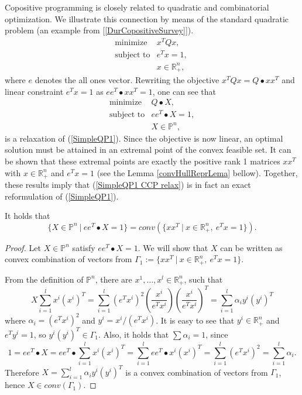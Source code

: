 \documentclass[12pt]{book}
\theoremstyle{definition}
\begin{document}
Copositive programming is closely related to quadratic and combinatorial
optimization. 
We illustrate this connection by means of the standard quadratic
problem (an example from [\ref{DurCopositiveSurvey}]).
\begin{equation}
\label{SimpleQP1}
\begin{array}{ll}
\mbox{minimize} & x^TQx,\\
\mbox{subject to}& e^Tx   = 1, \ \\
& x \in \mathbb{R}^n_+,
\end{array}
\end{equation}
where $e$ denotes the all ones vector. Rewriting the objective $x^TQx = Q\bullet xx^T$ and linear constraint $e^Tx = 1 $ as $ee^T\bullet xx^T = 1$, one can see that  
\begin{equation}
\label{SimpleQP1 CCP relax}
\begin{array}{ll}
\mbox{minimize} & Q\bullet X,\\
\mbox{subject to}& ee^T\bullet X  =1 , \\
& X \in \mathbb{P}^n,
\end{array}
\end{equation}
is a relaxation of (\ref{SimpleQP1}). Since the objective is now linear, an
optimal solution must be attained in an extremal point of the convex feasible
set. It can be shown that these extremal points are exactly the positive rank 1
matrices $xx^T$ with $x\in\mathbb{R}^n_+$ and $e^T x = 1$ (see the Lemma \ref{convHullReprLema} bellow). Together, these results imply that (\ref{SimpleQP1 CCP relax}) is in fact an exact reformulation of (\ref{SimpleQP1}).

\lema \label{convHullReprLema} It holds that $$\{X\in \mathbb{P}^n\ \vert \ ee^T\bullet X = 1\} = conv\left( \{ xx^T \ \vert \ x\in\mathbb{R}^n_+, \ e^T x = 1 \}\right). $$ \rm
\begin{proof}
Let $X\in\mathbb{P}^n$ satisfy $ee^T\bullet X = 1$. We will show that $X$ can be written as convex combination of vectors from $\Gamma_1:= \{ xx^T \ \vert \ x\in\mathbb{R}^n_+, \ e^T x = 1 \}.$ 

From the definition of $\mathbb{P}^n$, there are $x^1,\dots ,x^l\in \mathbb{R}^n_+$, such that  
\begin{equation*}
 X  \sum_{i=1}^l x^i(x^i)^T = \sum_{i=1}^l  (e^Tx^i)^2 \left(\frac{x^i}{e^Tx^i}\right)\left(\frac{x^i}{e^Tx^i}\right)^T =  \sum_{i=1}^l  \alpha_i y^i(y^i)^T
\end{equation*}
where $\alpha_i = (e^Tx^i)^2$ and $y^i =  x^i/(e^Tx^i)$. It is easy to see that $y^i\in \mathbb{R}^n_+$ and $e^Ty^i = 1$, so $y^i(y^i)^T\in \Gamma_1$.  
Also, it holds that $\sum \alpha_i = 1$, since 
\begin{equation*}
1 = ee^T\bullet X = ee^T\bullet \sum_{i=1}^l x^i(x^i)^T = \sum_{i=1}^lee^T\bullet x^i(x^i)^T = \sum_{i=1}^l (e^Tx^i)^2 = \sum_{i=1}^l \alpha_i.
\end{equation*}
Therefore $X = \sum_{i=1}^l  \alpha_i y^i(y^i)^T$ is a convex combination of vectors from $\Gamma_1$, hence $X\in conv(\Gamma_1)$.


\end{proof}
\end{document}
